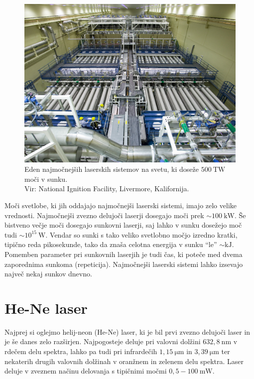 \begin{figure}[h!]
\centering
\includegraphics[width=100truemm]{slike/07_NIF_Laser_Bay.jpg}
\caption{Eden najmočnejših laserskih sistemov na svetu, ki doseže 
$500~\si{\tera\watt}$ moči v sunku. \\Vir: National Ignition Facility, Livermore, Kalifornija.}
\label{fig:NIF}
\end{figure}

Moči svetlobe, ki jih oddajajo najmočnejši laserski sistemi, imajo zelo velike
vrednosti. Najmočnejši zvezno delujoči laserji dosegajo moči prek 
$\sim 100~\si{\kilo\watt}$. Še bistveno večje moči dosegajo sunkovni laserji, 
saj lahko v sunku dosežejo moč tudi $\sim 10^{15}~\si{\watt}$. 
Vendar so sunki s tako veliko svetlobno močjo izredno kratki, tipično reda pikosekunde, tako da
znaša celotna energija v sunku ``le'' $\sim \si{\kilo\joule}$. Pomemben
parameter pri sunkovnih laserjih je tudi čas, ki poteče med dvema zaporednima
sunkoma (repeticija). Najmočnejši laserski sistemi lahko izsevajo največ nekaj sunkov dnevno. 

\section{He-Ne laser}
Najprej si oglejmo helij-neon (He-Ne) laser, ki je bil prvi zvezno 
delujoči laser in je še danes zelo razširjen. Najpogosteje deluje 
pri valovni dolžini $632,8~\si{\nano\metre}$ v rdečem delu spektra, lahko 
pa tudi pri infrardečih $1,15~\si{\micro\metre}$ in 
$3,39~\si{\micro\metre}$ ter nekaterih drugih
valovnih dolžinah v oranžnem in zelenem delu spektra. Laser deluje v zveznem 
načinu delovanja s tipičnimi močmi $0,5 - 100~\si{\milli\watt}$.

